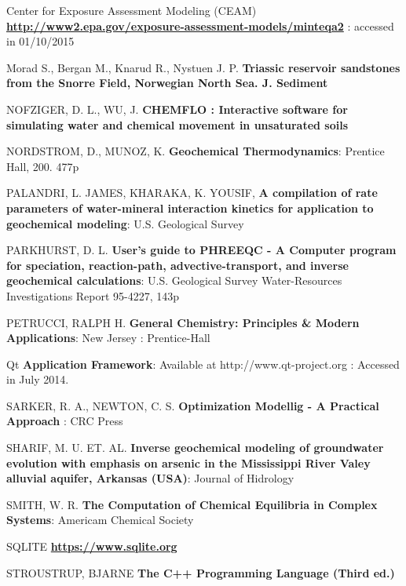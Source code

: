 \documentclass[ppgc,mestrado,English]{iiufrgs}
\begin{document}
\begin{thebibliography}{este-parametro-nao-eh-usado-pelo-estilo-ABNT}
 Center for Exposure Assessment Modeling (CEAM)
\textbf{ \url{http://www2.epa.gov/exposure-assessment-models/minteqa2} } : accessed in 01/10/2015

 Morad S., Bergan M., Knarud R., Nystuen J. P.
\textbf{Triassic reservoir sandstones from the Snorre Field, Norwegian North Sea. J. Sediment}

 NOFZIGER, D. L., WU, J.
\textbf{CHEMFLO : Interactive software for simulating water and chemical movement in unsaturated soils}

 NORDSTROM, D., MUNOZ, K.
\textbf{Geochemical Thermodynamics}: Prentice Hall, 200. 477p

 PALANDRI, L. JAMES, KHARAKA, K. YOUSIF,
\textbf{A compilation of rate parameters of water-mineral interaction kinetics for application to geochemical modeling}: U.S. Geological Survey

 PARKHURST, D. L.
\textbf{User's guide to PHREEQC - A Computer program for speciation, reaction-path, advective-transport, and inverse geochemical calculations}: U.S. Geological Survey Water-Resources Investigations Report 95-4227, 143p

 PETRUCCI, RALPH H.
\textbf{General Chemistry: Principles \& Modern Applications}: New Jersey : Prentice-Hall

 Qt
\textbf{Application Framework}: Available at http://www.qt-project.org : Accessed in July 2014.

 SARKER, R. A., NEWTON, C. S.
\textbf{Optimization Modellig - A Practical Approach} : CRC Press
   
 SHARIF, M. U. ET. AL. 
\textbf{Inverse geochemical modeling of groundwater evolution with emphasis on arsenic in the Mississippi River Valey alluvial aquifer, Arkansas (USA)}: Journal of Hidrology

 SMITH, W. R. 
\textbf{The Computation of Chemical Equilibria in Complex Systems}: Americam Chemical Society

 SQLITE
\textbf{ \url{https://www.sqlite.org} }

 STROUSTRUP, BJARNE
\textbf{The C++ Programming Language (Third ed.)}


\end{thebibliography}
\end{document}
